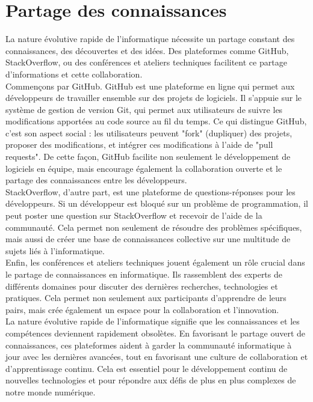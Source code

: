 \section{Partage des connaissances} 
La nature évolutive rapide de l'informatique nécessite un partage constant des connaissances, des découvertes et des idées. Des plateformes comme GitHub, StackOverflow, ou des conférences et ateliers techniques facilitent ce partage d'informations et cette collaboration.\\

Commençons par GitHub. GitHub est une plateforme en ligne qui permet aux développeurs de travailler ensemble sur des projets de logiciels. Il s'appuie sur le système de gestion de version Git, qui permet aux utilisateurs de suivre les modifications apportées au code source au fil du temps. Ce qui distingue GitHub, c'est son aspect social : les utilisateurs peuvent "fork" (dupliquer) des projets, proposer des modifications, et intégrer ces modifications à l'aide de "pull requests". De cette façon, GitHub facilite non seulement le développement de logiciels en équipe, mais encourage également la collaboration ouverte et le partage des connaissances entre les développeurs.\\

StackOverflow, d'autre part, est une plateforme de questions-réponses pour les développeurs. Si un développeur est bloqué sur un problème de programmation, il peut poster une question sur StackOverflow et recevoir de l'aide de la communauté. Cela permet non seulement de résoudre des problèmes spécifiques, mais aussi de créer une base de connaissances collective sur une multitude de sujets liés à l'informatique.\\

Enfin, les conférences et ateliers techniques jouent également un rôle crucial dans le partage de connaissances en informatique. Ils rassemblent des experts de différents domaines pour discuter des dernières recherches, technologies et pratiques. Cela permet non seulement aux participants d'apprendre de leurs pairs, mais crée également un espace pour la collaboration et l'innovation.\\

La nature évolutive rapide de l'informatique signifie que les connaissances et les compétences deviennent rapidement obsolètes. En favorisant le partage ouvert de connaissances, ces plateformes aident à garder la communauté informatique à jour avec les dernières avancées, tout en favorisant une culture de collaboration et d'apprentissage continu. Cela est essentiel pour le développement continu de nouvelles technologies et pour répondre aux défis de plus en plus complexes de notre monde numérique.\\


